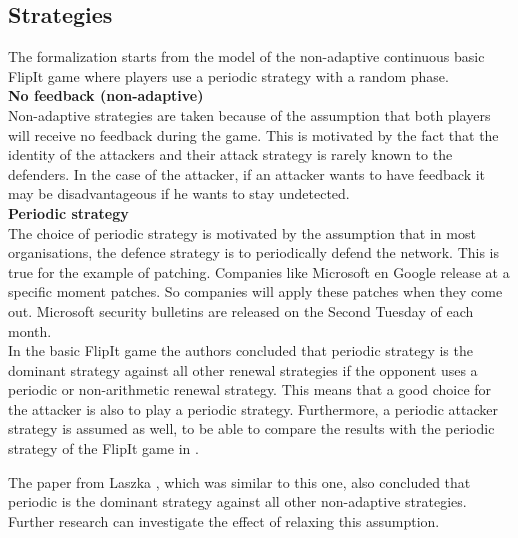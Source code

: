 \subsection{Strategies}
The formalization starts from the model of the non-adaptive continuous basic FlipIt game where players use a periodic strategy with a random phase. \\

\textbf{No feedback (non-adaptive)}\\
Non-adaptive strategies are taken because of the assumption that both players will receive no feedback during the game. This is motivated by the fact that the identity of the attackers and their attack strategy is rarely known to the defenders. In the case of the attacker, if an attacker wants to have feedback it may be disadvantageous if he wants to stay undetected. \\

\textbf{Periodic strategy}\\
The choice of periodic strategy is motivated by the assumption that in most organisations, the defence strategy is to periodically defend the network.  This is true for the example of patching. Companies like Microsoft en Google release at a specific moment patches. So companies will apply these patches when they come out. Microsoft security bulletins are released on the Second Tuesday of each month. \cite{MicroPatch} \\

In the basic FlipIt game \citep{FlipIt} the authors concluded that periodic strategy is the dominant strategy against all other renewal strategies if the opponent uses a periodic or non-arithmetic renewal strategy.  This means that a good choice for the attacker is also to play a periodic strategy. Furthermore, a periodic attacker strategy is assumed as well, to be able to compare the results with the periodic strategy of the FlipIt game in \cite{FlipIt}.

The paper from Laszka \citep{MitigationNonTargeted}, which was similar to this one, also concluded that periodic is the dominant strategy against all other non-adaptive strategies.
Further research can investigate the effect of relaxing this assumption. \\









